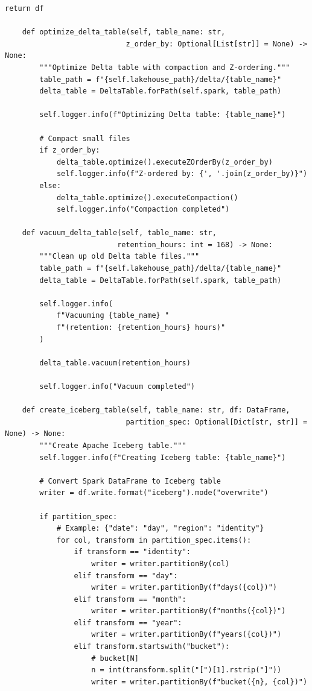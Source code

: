 \begin{lstlisting}[style=python, caption=LakehouseIntegrator with Modern Table Formats]
        return df

    def optimize_delta_table(self, table_name: str,
                            z_order_by: Optional[List[str]] = None) -> None:
        """Optimize Delta table with compaction and Z-ordering."""
        table_path = f"{self.lakehouse_path}/delta/{table_name}"
        delta_table = DeltaTable.forPath(self.spark, table_path)

        self.logger.info(f"Optimizing Delta table: {table_name}")

        # Compact small files
        if z_order_by:
            delta_table.optimize().executeZOrderBy(z_order_by)
            self.logger.info(f"Z-ordered by: {', '.join(z_order_by)}")
        else:
            delta_table.optimize().executeCompaction()
            self.logger.info("Compaction completed")

    def vacuum_delta_table(self, table_name: str,
                          retention_hours: int = 168) -> None:
        """Clean up old Delta table files."""
        table_path = f"{self.lakehouse_path}/delta/{table_name}"
        delta_table = DeltaTable.forPath(self.spark, table_path)

        self.logger.info(
            f"Vacuuming {table_name} "
            f"(retention: {retention_hours} hours)"
        )

        delta_table.vacuum(retention_hours)

        self.logger.info("Vacuum completed")

    def create_iceberg_table(self, table_name: str, df: DataFrame,
                            partition_spec: Optional[Dict[str, str]] = None) -> None:
        """Create Apache Iceberg table."""
        self.logger.info(f"Creating Iceberg table: {table_name}")

        # Convert Spark DataFrame to Iceberg table
        writer = df.write.format("iceberg").mode("overwrite")

        if partition_spec:
            # Example: {"date": "day", "region": "identity"}
            for col, transform in partition_spec.items():
                if transform == "identity":
                    writer = writer.partitionBy(col)
                elif transform == "day":
                    writer = writer.partitionBy(f"days({col})")
                elif transform == "month":
                    writer = writer.partitionBy(f"months({col})")
                elif transform == "year":
                    writer = writer.partitionBy(f"years({col})")
                elif transform.startswith("bucket"):
                    # bucket[N]
                    n = int(transform.split("[")[1].rstrip("]"))
                    writer = writer.partitionBy(f"bucket({n}, {col})")


\end{lstlisting}
